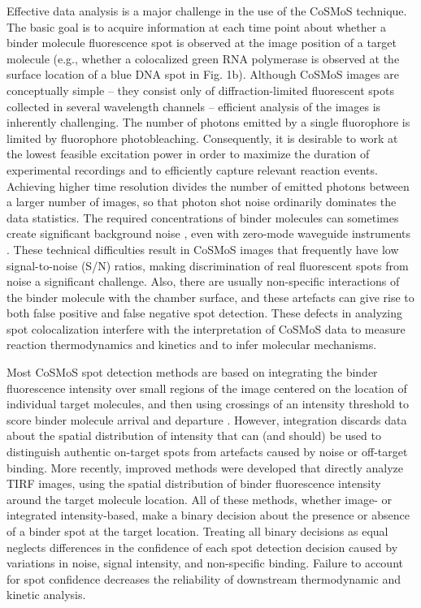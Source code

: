 Effective data analysis is a major challenge in the use of the CoSMoS technique. The basic goal is to acquire information at each time point about whether a binder molecule fluorescence spot is observed at the image position of a target molecule (e.g., whether a colocalized green RNA polymerase is observed at the surface location of a blue DNA spot in Fig. 1b). Although CoSMoS images are conceptually simple -- they consist only of diffraction-limited fluorescent spots collected in several wavelength channels -- efficient analysis of the images is inherently challenging. The number of photons emitted by a single fluorophore is limited by fluorophore photobleaching. Consequently, it is desirable to work at the lowest feasible excitation power in order to maximize the duration of experimental recordings and to efficiently capture relevant reaction events. Achieving higher time resolution divides the number of emitted photons between a larger number of images, so that photon shot noise ordinarily dominates the data statistics. The required concentrations of binder molecules can sometimes create significant background noise \cite{Peng2018-ge, Van_Oijen2011-ig}, even with zero-mode waveguide instruments \cite{Chen2014-jd}. These technical difficulties result in CoSMoS images that frequently have low signal-to-noise (S/N) ratios, making discrimination of real fluorescent spots from noise a significant challenge. Also, there are usually non-specific interactions of the binder molecule with the chamber surface, and these artefacts can give rise to both false positive and false negative spot detection. These defects in analyzing spot colocalization interfere with the interpretation of CoSMoS data to measure reaction thermodynamics and kinetics and to infer molecular mechanisms.

Most CoSMoS spot detection methods are based on integrating the binder fluorescence intensity over small regions of the image  centered on the location of individual target molecules, and then using crossings of an intensity threshold to score binder molecule arrival and departure \cite{Friedman2015-nx}. However, integration discards data about the spatial distribution of intensity that can (and should) be used to distinguish authentic on-target spots from artefacts caused by noise or off-target binding.  More recently, improved methods \cite{Friedman2015-nx,Smith2019-yb} were developed that directly analyze TIRF images, using the spatial distribution of binder fluorescence intensity around the target molecule location. All of these methods, whether image- or integrated intensity-based, make a binary decision about the presence or absence of a binder spot at the target location.  Treating all binary decisions as equal neglects differences in the confidence of each spot detection decision caused by variations in noise, signal intensity, and non-specific binding.  Failure to account for spot confidence decreases the reliability of downstream thermodynamic and kinetic analysis.

